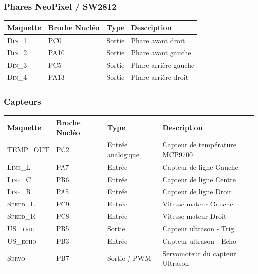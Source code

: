 \documentclass[a4paper,11pt,titlepage]{article} %
\begin{document}
\subsubsection{Phares NeoPixel / SW2812}

\begin{center}
\begin{tabular}{|l|l|l|l|}
\hline 
Maquette & \textbf{Broche Nucléo} & Type & Description \\ 
\hline 
\textsc{Din\_1} & PC0 & Sortie & Phare avant droit\\ 
\textsc{Din\_2} & PA10 & Sortie & Phare avant gauche\\ 
\textsc{Din\_3} & PC5 & Sortie & Phare arrière gauche\\ 
\textsc{Din\_4} & PA13 & Sortie & Phare arrière droit\\ 
\hline  
\end{tabular} 
\end{center}

\subsubsection{Capteurs}

\begin{center}
\begin{tabular}{|l|l|l|l|}
\hline 
Maquette & \textbf{Broche Nucléo} & Type & Description \\ 
\hline 
\textsc{TEMP\_OUT} & PC2 & Entrée analogique & Capteur de température MCP9700\\ 
\hline 
\textsc{Line\_L} & PA7 & Entrée & Capteur de ligne Gauche\\ 
\textsc{Line\_C} & PB6 & Entrée & Capteur de ligne Centre\\ 
\textsc{Line\_R} & PA5 & Entrée & Capteur de ligne Droit\\ 
\hline 
\textsc{Speed\_L} & PC9 & Entrée & Vitesse moteur Gauche\\ 
\textsc{Speed\_R} & PC8 & Entrée & Vitesse moteur Droit\\ 
\hline  
\textsc{US\_trig} & PB5 & Sortie & Capteur ultrason - Trig\\ 
\textsc{US\_echo} & PB3 & Entrée & Capteur ultrason - Echo\\ 
\textsc{Servo} & PB7 & Sortie / PWM & Servomoteur du capteur Ultrason\\ 
\hline  
\end{tabular} 
\end{center}
\end{document}
